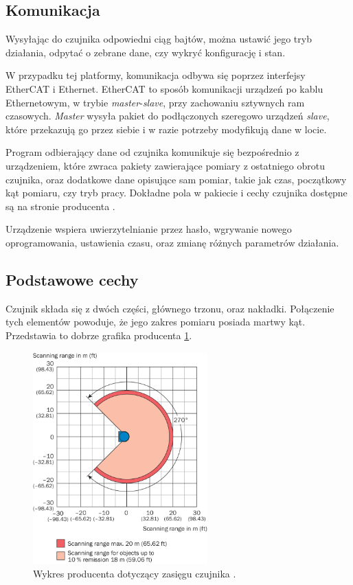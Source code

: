 	\subsection{Komunikacja}
		Wysyłając do czujnika odpowiedni ciąg bajtów, można ustawić jego tryb działania, odpytać o zebrane dane, czy wykryć konfigurację i stan.

		W przypadku tej platformy, komunikacja odbywa się poprzez interfejsy EtherCAT i Ethernet.
		EtherCAT to sposób komunikacji urządzeń po kablu Ethernetowym, w trybie \emph{master}-\emph{slave}, przy zachowaniu sztywnych ram czasowych. 
		\emph{Master} wysyła pakiet do podłączonych szeregowo urządzeń \emph{slave}, które przekazują go przez siebie i w razie potrzeby modyfikują dane w locie.
		
		Program odbierający dane od czujnika komunikuje się bezpośrednio z urządzeniem, które zwraca pakiety zawierające pomiary z ostatniego obrotu czujnika, oraz dodatkowe dane 
		opisujące sam pomiar, takie jak czas, początkowy kąt pomiaru, czy tryb pracy.
		Dokładne pola w pakiecie i cechy czujnika dostępne są na stronie producenta \cite{sick_website}.

		Urządzenie wspiera uwierzytelnianie przez hasło, wgrywanie nowego oprogramowania,
		ustawienia czasu, oraz zmianę różnych parametrów działania.

	\subsection{Podstawowe cechy}
		Czujnik składa się z dwóch części, głównego trzonu, oraz nakładki.
		Połączenie tych elementów powoduje, że jego zakres pomiaru posiada martwy kąt.
		Przedstawia to dobrze grafika producenta \ref{fig:lidar}.
		\begin{figure}[h]
		\centering
		\includegraphics[width=0.6\textwidth]{graphics/sick.png}
		\caption{Wykres producenta dotyczący zasięgu czujnika \cite{sick_website}.}
		\label{fig:lidar}
		\end{figure} 
		
